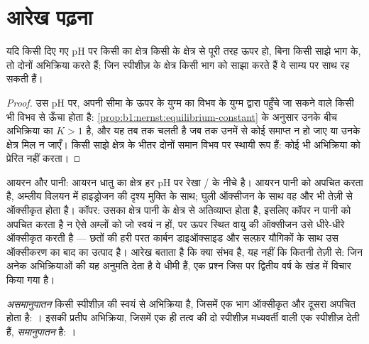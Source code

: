 \section{आरेख पढ़ना}\label{sec:b1:e-ph-diagrams:reading}

\begin{proposition}[असंयुक्त क्षेत्र]\label{prop:b1:e-ph-diagrams:disjoint-domains}
यदि किसी दिए गए pH पर किसी  का क्षेत्र किसी  के क्षेत्र से
पूरी तरह ऊपर हो, बिना किसी साझे भाग के, तो दोनों अभिक्रिया करते हैं; जिन स्पीशीज़ के क्षेत्र
किसी भाग को साझा करते हैं वे साम्य पर साथ रह सकती हैं।
\end{proposition}

\begin{proof}
उस pH पर, अपनी सीमा के ऊपर  के युग्म का विभव
 के युग्म द्वारा पहुँचे जा सकने वाले किसी भी विभव से ऊँचा होता है:
\cref{prop:b1:nernst:equilibrium-constant} के अनुसार उनके बीच अभिक्रिया का
$K > 1$ है, और यह तब तक चलती है जब तक उनमें से कोई समाप्त न हो जाए या उनके क्षेत्र
मिल न जाएँ। किसी साझे क्षेत्र के भीतर दोनों समान विभव पर स्थायी रूप हैं:
कोई भी अभिक्रिया को प्रेरित नहीं करता।
\end{proof}

आयरन और पानी: आयरन धातु का क्षेत्र हर pH पर रेखा
/ के नीचे है। आयरन पानी को अपचित करता है, अम्लीय विलयन में
हाइड्रोजन की दृश्य मुक्ति के साथ; घुली ऑक्सीजन के साथ वह और भी
तेज़ी से ऑक्सीकृत होता है। कॉपर: उसका क्षेत्र पानी के क्षेत्र से अतिव्याप्त होता है, इसलिए कॉपर
न पानी को अपचित करता है न ऐसे अम्लों को जो स्वयं  न हों, पर
ऊपर स्थित वायु की ऑक्सीजन उसे धीरे-धीरे ऑक्सीकृत करती है --- छतों की हरी परत
कार्बन डाइऑक्साइड और सल्फ़र यौगिकों के साथ उस ऑक्सीकरण का बाद का उत्पाद है।
आरेख बताता है कि क्या संभव है, यह नहीं कि कितनी तेज़ी से: जिन अनेक अभिक्रियाओं की
यह अनुमति देता है वे धीमी हैं, एक प्रश्न जिस पर द्वितीय वर्ष के खंड में विचार किया गया है।

\begin{definition}[असमानुपातन, समानुपातन]\label{def:b1:e-ph-diagrams:disproportionation}
\emph{असमानुपातन} किसी
स्पीशीज़ की स्वयं से अभिक्रिया है, जिसमें एक भाग ऑक्सीकृत और दूसरा अपचित होता है:
। इसकी प्रतीप अभिक्रिया, जिसमें एक ही तत्व की दो स्पीशीज़
मध्यवर्ती  वाली एक स्पीशीज़ देती हैं,
\emph{समानुपातन} है:
।
\end{definition}

